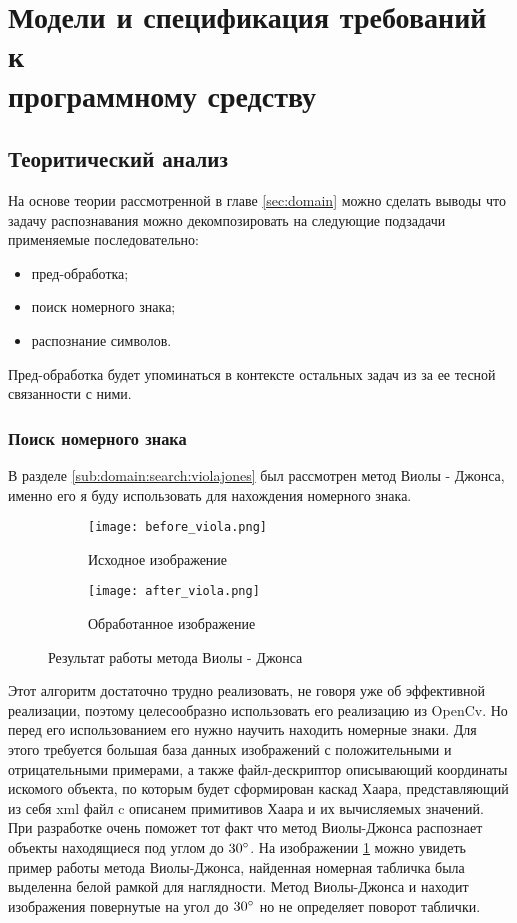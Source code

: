 \section{Модели и спецификация требований к\\ программному средству}
\label{sec:funcreq}

\subsection{Теоритический анализ}
\label{sec:funcreq:teoretical_anolisys}

На основе теории рассмотренной в главе \ref{sec:domain} можно сделать выводы что задачу распознавания можно декомпозировать на следующие подзадачи применяемые последовательно:
\begin{itemize}
	\item пред-обработка;
	\item поиск номерного знака;
	\item распознание символов.
\end{itemize} 

Пред-обработка будет упоминаться в контексте остальных задач из за ее тесной связанности с ними.

\subsubsection{Поиск номерного знака}
\label{seq:funcreq:analisys}

В разделе \ref{sub:domain:search:violajones} был рассмотрен метод Виолы - Джонса, именно его я буду использовать для нахождения номерного знака. 
\begin{figure}[ht]
\centering
  \begin{subfigure}[b]{0.48\textwidth} 
    \centering
    \texttt{[image: before\_viola.png]}  
    \caption{Исходное изображение}
  \end{subfigure}
  \begin{subfigure}[b]{0.48\textwidth} 
    \centering
    \texttt{[image: after\_viola.png]}  
    \caption{Обработанное изображение}
  \end{subfigure}
  \caption{Результат работы метода Виолы - Джонса}
  \label{fig:funcreq:analisys:viola}
\end{figure}
Этот алгоритм достаточно трудно реализовать, не говоря уже об эффективной реализации, поэтому целесообразно использовать его реализацию из OpenCv. Но перед его использованием его нужно научить находить номерные знаки. Для этого требуется большая база данных изображений с положительными и отрицательными примерами, а также файл-дескриптор описывающий координаты искомого объекта, по которым будет сформирован каскад Хаара, представляющий из себя xml файл c описанем примитивов Хаара и их вычисляемых значений. При разработке очень поможет тот факт что метод Виолы-Джонса распознает объекты находящиеся под углом до $30\degree$. На изображении \ref{fig:funcreq:analisys:viola} можно увидеть пример работы метода Виолы-Джонса, найденная номерная табличка была выделенна белой рамкой для наглядности. Метод Виолы-Джонса и находит изображения повернутые на угол до $30\degree$ но не определяет поворот таблички. 

